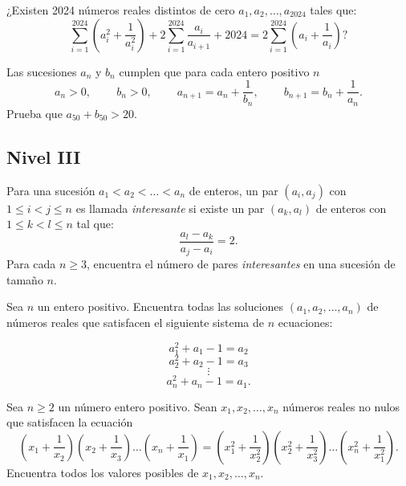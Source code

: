 \documentclass[11pt]{scrartcl}
\newcommand{\thmdifficulty}{0}
\newcommand{\problemdiff}[1]{\renewcommand{\thmdifficulty}{#1}}
\begin{document}
\problemdiff{4}
\begin{problem}
    ¿Existen 2024 números reales distintos de cero $a_1,a_2, \ldots, a_{2024}$ tales que:
    \[\sum_{i=1}^{2024}\left(a_i^2+\frac{1}{a_{i}^2}\right) + 2\sum_{i=1}^{2024}\frac{a_i}{a_{i+1}}+2024=2\sum_{i=1}^{2024}\left(a_i+\frac{1}{a_i}\right)?\]
\end{problem}

\problemdiff{4.5}
\begin{problem}
    Las sucesiones $a_n$ y $b_n$ cumplen que para cada entero positivo $n$ 
    \[ a_n > 0,\qquad\ b_n>0,\qquad\ a_{n+1}=a_n+\dfrac{1}{b_n},\qquad\ b_{n+1} = b_n+\dfrac{1}{a_n}. \]
    Prueba que $a_{50}+b_{50}>20$.
\end{problem}

\subsection{Nivel III}

\problemdiff{5}
\begin{problem}
    Para una sucesión $a_1 < a_2 < \ldots < a_n$ de enteros, un par $(a_i, a_j)$ con $1 \leq i < j \leq n$ es llamada \textit{interesante} si existe un par $(a_k, a_l)$ de enteros con $1\leq k < l \leq n$ tal que:
    $$\frac{a_l-a_k}{a_j-a_i}=2.$$
    Para cada $n \geq 3$, encuentra el número de pares \textit{interesantes} en una sucesión de tamaño $n$.
\end{problem}

\problemdiff{5}
\begin{problem}
    
    Sea $n$ un entero positivo. Encuentra todas las soluciones $(a_1, a_2,\dots , a_n)$ de números reales
que satisfacen el siguiente sistema de $n$ ecuaciones:

\[a_1^2 + a_1 - 1 = a_2\]
\[ a_2^2 + a_2 - 1 = a_3\]
\[\vdots \]
\[a_{n}^2 + a_n - 1 = a_1.\]
 
\end{problem}


\problemdiff{5}
\begin{problem}
    
    Sea $n\ge 2$ un número entero positivo. Sean $x_1, x_2, \dots, x_n$ números reales no nulos que satisfacen la ecuación
\[\left(x_1+\frac{1}{x_2}\right)\left(x_2+\frac{1}{x_3}\right)\dots\left(x_n+\frac{1}{x_1}\right)=\left(x_1^2+\frac{1}{x_2^2}\right)\left(x_2^2+\frac{1}{x_3^2}\right)\dots\left(x_n^2+\frac{1}{x_1^2}\right). \]
Encuentra todos los valores posibles de $x_1, x_2, \dots, x_n$.
\end{problem}
\end{document}
